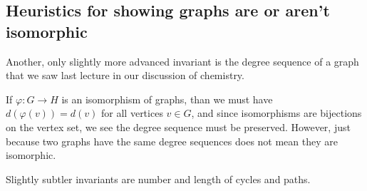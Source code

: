 \documentclass[10pt,]{book}
\theoremstyle{plain}
\theoremstyle{definition}
\theoremstyle{definition}
\theoremstyle{definition}
\theoremstyle{definition}
\numberwithin{equation}{section}
\begin{document}
\subsection[{Heuristics for showing graphs are or aren't isomorphic}]{Heuristics for showing graphs are or aren't isomorphic}\label{subsection-8}
\hypertarget{p-46}{}%
Another, only slightly more advanced invariant is the degree sequence of a graph that we saw last lecture in our discussion of chemistry.%
\par
\hypertarget{p-47}{}%
If \(\varphi:G\to H\) is an isomorphism of graphs, than we must have \(d(\varphi(v))=d(v)\) for all vertices \(v\in G\), and since isomorphisms are bijections on the vertex set, we see the degree sequence must be preserved.  However, just because two graphs have the same degree sequences does not mean they are isomorphic.%
\par
\hypertarget{p-48}{}%
Slightly subtler invariants are number and length of cycles and paths.%
\typeout{************************************************}
\typeout{************************************************}
\end{document}
